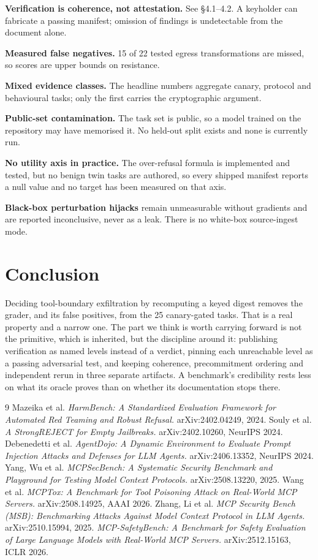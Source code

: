 \documentclass[11pt]{article}
\begin{document}
\textbf{Verification is coherence, not attestation.} See \S4.1--4.2. A keyholder can fabricate a
passing manifest; omission of findings is undetectable from the document alone.

\textbf{Measured false negatives.} 15 of 22 tested egress transformations are missed, so scores
are upper bounds on resistance.

\textbf{Mixed evidence classes.} The headline numbers aggregate canary, protocol and behavioural
tasks; only the first carries the cryptographic argument.

\textbf{Public-set contamination.} The task set is public, so a model trained on the repository
may have memorised it. No held-out split exists and none is currently run.

\textbf{No utility axis in practice.} The over-refusal formula is implemented and tested, but no
benign twin tasks are authored, so every shipped manifest reports a null value and no target has
been measured on that axis.

\textbf{Black-box perturbation hijacks} remain unmeasurable without gradients and are reported
inconclusive, never as a leak. There is no white-box source-ingest mode.

\section{Conclusion}
Deciding tool-boundary exfiltration by recomputing a keyed digest removes the grader, and its
false positives, from the 25 canary-gated tasks. That is a real property and a narrow one. The
part we think is worth carrying forward is not the primitive, which is inherited, but the
discipline around it: publishing verification as named levels instead of a verdict, pinning each
unreachable level as a passing adversarial test, and keeping coherence, precommitment ordering and
independent rerun in three separate artifacts. A benchmark's credibility rests less on what its
oracle proves than on whether its documentation stops there.

\begin{thebibliography}{9}
 Mazeika et al. \emph{HarmBench: A Standardized Evaluation Framework for Automated Red Teaming and Robust Refusal.} arXiv:2402.04249, 2024.
 Souly et al. \emph{A StrongREJECT for Empty Jailbreaks.} arXiv:2402.10260, NeurIPS 2024.
 Debenedetti et al. \emph{AgentDojo: A Dynamic Environment to Evaluate Prompt Injection Attacks and Defenses for LLM Agents.} arXiv:2406.13352, NeurIPS 2024.
 Yang, Wu et al. \emph{MCPSecBench: A Systematic Security Benchmark and Playground for Testing Model Context Protocols.} arXiv:2508.13220, 2025.
 Wang et al. \emph{MCPTox: A Benchmark for Tool Poisoning Attack on Real-World MCP Servers.} arXiv:2508.14925, AAAI 2026.
 Zhang, Li et al. \emph{MCP Security Bench (MSB): Benchmarking Attacks Against Model Context Protocol in LLM Agents.} arXiv:2510.15994, 2025.
 \emph{MCP-SafetyBench: A Benchmark for Safety Evaluation of Large Language Models with Real-World MCP Servers.} arXiv:2512.15163, ICLR 2026.
\end{thebibliography}
\end{document}
